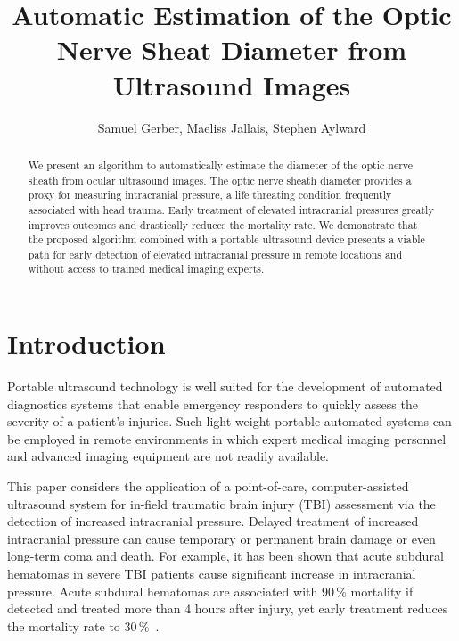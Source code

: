 \documentclass{llncs}
\begin{document}
\title{Automatic Estimation of the Optic Nerve Sheat Diameter from Ultrasound Images}
%
%
\author{
Samuel Gerber,
Maeliss Jallais,
Stephen Aylward
}

%
%
%

\maketitle              %

\begin{abstract}
We present an algorithm to automatically estimate the diameter of the optic
nerve sheath from ocular ultrasound images. The optic nerve sheath diameter
provides a proxy for measuring intracranial pressure,  a life threating
condition frequently associated with head trauma. Early treatment of elevated
intracranial pressures greatly improves outcomes and drastically reduces the
mortality rate. We demonstrate that the proposed algorithm combined with a
portable ultrasound device presents a viable path for early detection of
elevated intracranial pressure in remote locations and without access to
trained medical imaging experts. 
\end{abstract}
%
\section{Introduction}
Portable ultrasound technology is well suited for the development of automated
diagnostics systems that enable emergency responders to quickly assess the
severity of a patient's injuries. Such light-weight portable automated systems
can be employed in remote environments in which expert medical imaging
personnel and advanced imaging equipment are not readily available.
 
This paper considers the application of a point-of-care, computer-assisted
ultrasound system for in-field traumatic brain injury (TBI) assessment via the
detection of increased intracranial pressure. Delayed treatment of increased
intracranial pressure can cause temporary or permanent brain damage or even
long-term coma and death. For example, it has been shown that acute subdural
hematomas in severe TBI patients cause significant increase in intracranial
pressure. Acute subdural hematomas are associated with 90\,\% mortality if
detected and treated more than 4 hours after injury, yet early treatment
reduces the mortality rate to 30\,\%~\cite{Se1981}.
\end{document}
